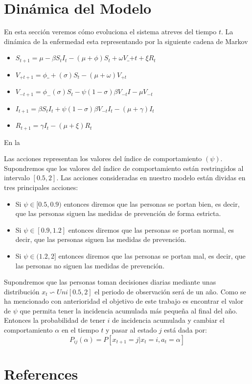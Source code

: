 \documentclass[
  letterpaper,
  DIV=11,
  numbers=noendperiod]{scrreprt}
\newlength{\cslhangindent}
\newenvironment{CSLReferences}[2] %
 {\begin{list}{}{%
  \setlength{\itemindent}{0pt}
  \setlength{\leftmargin}{0pt}
  \setlength{\parsep}{0pt}
  \ifodd #1
   \setlength{\leftmargin}{\cslhangindent}
   \setlength{\itemindent}{-1\cslhangindent}
  \fi
  \setlength{\itemsep}{#2\baselineskip}}}
 {\end{list}}
\begin{document}

\chapter{Dinámica del Modelo}\label{dinuxe1mica-del-modelo}

En esta sección veremos cómo evoluciona el sistema atreves del tiempo
\(t\). La dinámica de la enfermedad esta representando por la siguiente
cadena de Markov

\begin{itemize}
\item
  \(S_{t+1}= \mu -\beta S_{t}I_{t}- (\mu + \phi)S_{t}+\omega V\_{+t}+\xi R_{t}\)
\item
  \(V_{+t+1}= \phi\_{+}(\sigma)S_{t}-(\mu+\omega) V_{+t}\)
\item
  \(V_{-t+1}=\phi_{-}(\sigma)S_{t}- \psi(1-\sigma) \beta V_{-t} I-\mu V_{-t}\)
\item
  \(I_{t+1}= \beta S_{t}I_{t}+\psi(1-\sigma) \beta V_{-t} I_{t} -(\mu+ \gamma)I_{t}\)
\item
  \(R_{t+1}=\gamma I_{t}-(\mu +\xi) R_{t}\)
\end{itemize}

En la

Las acciones representan los valores del índice de comportamiento
\((\psi)\). Supondremos que los valores del índice de comportamiento
están restringidos al intervalo \([0.5,2]\). Las acciones consideradas
en nuestro modelo están dividas en tres principales acciones:

\begin{itemize}
\item
  Si \(\psi\in [0.5,0.9)\) entonces diremos que las personas se portan
  bien, es decir, que las personas siguen las medidas de prevención de
  forma estricta.
\item
  Si \(\psi\in [0.9,1.2]\) entonces diremos que las personas se portan
  normal, es decir, que las personas siguen las medidas de prevención.
\item
  Si \(\psi\in (1.2,2]\) entonces diremos que las personas se portan
  mal, es decir, que las personas no siguen las medidas de prevención.
\end{itemize}

Supondremos que las personas toman decisiones diarias mediante unas
distribución \(x_{t} \backsim Uni[0.5,2]\) el periodo de observación
será de un año. Como se ha mencionado con anterioridad el objetivo de
este trabajo es encontrar el valor de \(\psi\) que permita tener la
incidencia acumulada más pequeña al final del año. Entonces la
probabilidad de tener \(i\) de incidencia acumulada y cambiar el
comportamiento \(\alpha\) en el tiempo \(t\) y pasar al estado \(j\)
está dada por: \[P_{ij}(\alpha)=P[x_{t+1}=j|x_{t}=i,a_{t}=\alpha]\]


\chapter*{References}\label{references}


\label{refs}
\begin{CSLReferences}{0}{1}
\end{CSLReferences}
\end{document}
